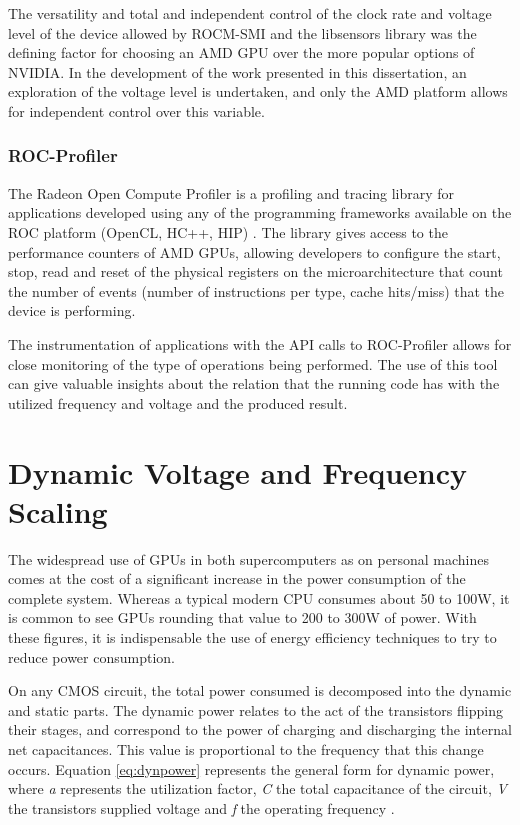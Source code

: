 The versatility and total and independent control of the clock rate and voltage level of the device allowed by ROCM-SMI and the libsensors library was the defining factor for choosing an AMD GPU over the more popular options of NVIDIA. In the development of the work presented in this dissertation, an exploration of the voltage level is undertaken, and only the AMD platform allows for independent control over this variable.

\subsubsection{ROC-Profiler}

The Radeon Open Compute Profiler \cite{noauthor_rocm-developer-tools/rocprofiler_2019} is a profiling and tracing library for applications developed using any of the programming frameworks available on the ROC platform (OpenCL, HC++, HIP) \cite{sun_evaluating_2018}. The library gives access to the performance counters of AMD GPUs, allowing developers to configure the start, stop, read and reset of the physical registers on the microarchitecture that count the number of events (number of instructions per type, cache hits/miss) that the device is performing.

The instrumentation of applications with the API calls to ROC-Profiler allows for close monitoring of the type of operations being performed. The use of this tool can give valuable insights about the relation that the running code has with the utilized frequency and voltage and the produced result.




\section{Dynamic Voltage and Frequency Scaling}
\label{section:dcvf}

The widespread use of GPUs in both supercomputers as on personal machines comes at the cost of a significant increase in the power consumption of the complete system. Whereas a typical modern CPU consumes about 50 to 100W, it is common to see GPUs rounding that value to 200 to 300W of power. With these figures, it is indispensable the use of energy efficiency techniques to try to reduce power consumption.

On any CMOS circuit, the total power consumed is decomposed into the dynamic and static parts. The dynamic power relates to the act of the transistors flipping their stages, and correspond to the power of charging and discharging the internal net capacitances. This value is proportional to the frequency that this change occurs. Equation \ref{eq:dynpower} represents the general form for dynamic power, where \textit{a} represents the utilization factor, \textit{C} the total capacitance of the circuit, \textit{V} the transistors supplied voltage and \textit{f} the operating frequency \cite{gonzalez_supply_1997}.

